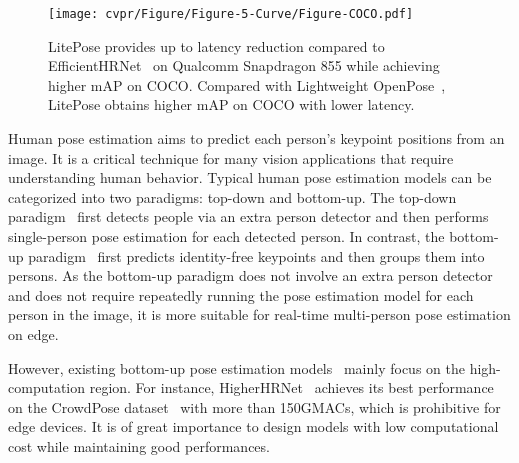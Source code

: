 \documentclass[10pt,twocolumn,letterpaper]{article}
\begin{document}
\begin{figure}
\centering
	\texttt{[image: cvpr/Figure/Figure-5-Curve/Figure-COCO.pdf]}
\caption{LitePose provides up to  latency reduction compared to EfficientHRNet~\cite{neff2020efficienthrnet} on Qualcomm Snapdragon 855 while achieving higher mAP on COCO. Compared with Lightweight OpenPose~\cite{osokin2018real}, LitePose obtains  higher mAP on COCO with lower latency.}
\label{fig:coco}
\end{figure} 
Human pose estimation aims to predict each person's keypoint positions from an image. It is a critical technique for many vision applications that require understanding human behavior. Typical human pose estimation models can be categorized into two paradigms: top-down and bottom-up. The top-down paradigm~\cite{kendall2015posenet,fang2017rmpe,he2017mask,wei2016convolutional,newell2016stacked,xiao2018simple,chen2018cascaded,sun2019deep} first detects people via an extra person detector and then performs single-person pose estimation for each detected person. In contrast, the bottom-up paradigm~\cite{newell2016stacked,pishchulin2016deepcut,insafutdinov2016deepercut,cao2019openpose,kreiss2019pifpaf,newell2016associative,cheng2020higherhrnet,geng2021bottom,jin2020differentiable,papandreou2018personlab} first predicts identity-free keypoints and then groups them into persons. As the bottom-up paradigm does not involve an extra person detector and does not require repeatedly running the pose estimation model for each person in the image, it is more suitable for real-time multi-person pose estimation on edge. 

However, existing bottom-up pose estimation models~\cite{newell2016stacked,pishchulin2016deepcut,insafutdinov2016deepercut,cao2019openpose,kreiss2019pifpaf,newell2016associative,cheng2020higherhrnet,geng2021bottom,jin2020differentiable,papandreou2018personlab} mainly focus on the high-computation region. For instance, HigherHRNet~\cite{cheng2020higherhrnet} achieves its best performance on the CrowdPose dataset~\cite{li2019crowdpose} with more than 150GMACs, which is prohibitive for edge devices. It is of great importance to design models with low computational cost while maintaining good performances. 
\end{document}
